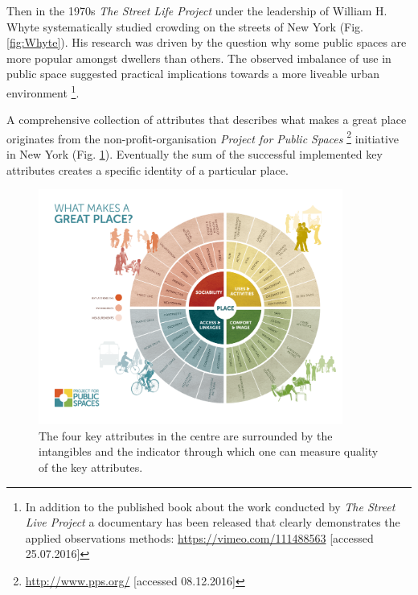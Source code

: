 Then in the 1970s \textit{The Street Life Project}  under the leadership of William H. Whyte  systematically studied crowding on the streets of New York (Fig. \ref{fig:Whyte}). His research was driven by the question why some public spaces are more popular amongst dwellers than others. The observed imbalance of use in public space suggested practical implications  towards a more liveable urban environment\cite{Whyte_1980} \footnote{In addition to the published book about the work conducted by \textit{The Street Live Project} a documentary has been released that clearly demonstrates the applied observations methods: \url{https://vimeo.com/111488563} [accessed 25.07.2016]}.


A comprehensive collection of attributes that describes what makes a great place originates from the non-profit-organisation \textit{Project for Public Spaces} \footnote{\url{http://www.pps.org/} [accessed 08.12.2016]}  initiative in New York (Fig. \ref{great_place}). 
Eventually the sum of the successful implemented key attributes creates a specific identity of a particular place. \hyperref[placemaking]{}  

\begin{figure}[h] 
\centering
\includegraphics[width=10cm]{Illustrations/great_place.png}
\caption [What makes a great place?] {The four key attributes in the centre are surrounded by the intangibles and the indicator through which one can measure quality of the key attributes.}
\label{great_place}
\end{figure}

